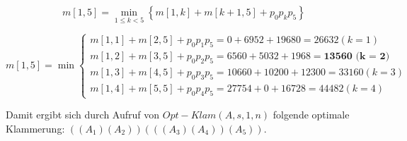 \documentclass{article}
\begin{document}
\begin{equation}
m[1, 5] = \min\limits_{1 \leq k < 5} \left\{ m[1, k] + m[k + 1, 5] + p_0p_kp_5 \right\}
\end{equation}

\begin{equation}
m[1, 5] = \min\begin{cases}
  m[1, 1] + m[2, 5] + p_0p_1p_5 = 0 + 6952 + 19680 = 26632 (k = 1) \\
  m[1, 2] + m[3, 5] + p_0p_2p_5 = 6560 + 5032 + 1968 = \textbf{13560 (k = 2)} \\
  m[1, 3] + m[4, 5] + p_0p_3p_5 = 10660 + 10200 + 12300 = 33160 (k = 3) \\
  m[1, 4] + m[5, 5] + p_0p_4p_5 = 27754 + 0 + 16728 = 44482 (k = 4)
\end{cases}
\end{equation}

Damit ergibt sich durch Aufruf von $Opt-Klam(A, s, 1, n)$ folgende optimale
Klammerung:
$\left( \left( A_1 \right) \left( A_2 \right) \right) \left( \left( \left( A_3 \right) \left( A_4 \right) \right) \left( A_5 \right) \right)$.
\end{document}
